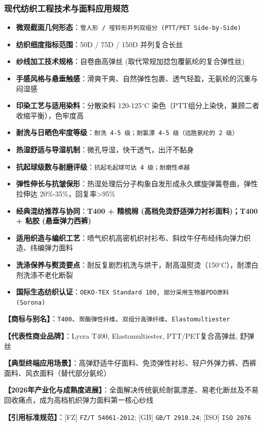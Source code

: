 \documentclass[11pt,openright,twoside,UTF8]{ctexbook}
\begin{document}
\subsubsection*{现代纺织工程技术与面料应用规范}
\begin{itemize} \setlength{\itemsep}{2pt}
    \item \textbf{微观截面几何形态}：\texttt{雪人形 / 哑铃形并列双组分 (PTT/PET Side-by-Side)}
    \item \textbf{纺织细度指标范围}：50D / 75D / 150D 并列复合长丝
    \item \textbf{纱线加工技术规格}：自卷曲高弹丝 (取代常规加捻包覆氨纶的复合弹性丝)
    \item \textbf{手感风格与悬垂触感}：滑爽干爽、自然弹性包裹、透气轻盈，无氨纶的沉重与闷湿感
    \item \textbf{印染工艺与适用染料}：分散染料 120-125$^\circ\mathrm{C}$ 染色（PTT组分上染快，兼顾二者收缩平衡），色牢度高
    \item \textbf{耐洗与日晒色牢度等级}：\texttt{耐洗 4-5 级；耐氯漂 4-5 级（远胜氨纶的 2 级）}
    \item \textbf{热湿舒适与导湿机制}：微孔导湿，快干透气，出汗不黏身
    \item \textbf{抗起球级数与耐磨评级}：\texttt{抗起毛起球可达 4 级；耐磨性卓越}
    \item \textbf{弹性伸长与抗皱保形}：热湿处理后分子构象自发形成永久螺旋弹簧卷曲，弹性拉伸达 20\%-35\%，回复率\textgreater{}95\%
    \item \textbf{经典混纺推荐与协同}：\textbf{T400 + 精梳棉 (高档免烫舒适弹力衬衫面料)；T400 + 粘胶 (悬垂弹力西裤)}
    \item \textbf{适用织造与编织工艺}：喷气织机高密机织衬衫布、斜纹牛仔布经纬向弹力织造、纬编弹力面料
    \item \textbf{洗涤保养与熨烫要点}：耐反复剧烈机洗与烘干，耐高温熨烫（150$^\circ\mathrm{C}$），耐漂白剂洗涤不老化断裂
    \item \textbf{国际生态纺织认证}：\texttt{OEKO-TEX Standard 100, 部分采用生物基PDO原料 (Sorona)}
\end{itemize}
\vspace{0.2cm}

\noindent\textbf{【商标与别名】}：\texttt{T400}、\texttt{聚酯弹性纤维}、\texttt{双组分高弹纤维}、\texttt{Elastomultiester}\par
\noindent\textbf{【代表性商业品牌】}：Lycra T400, Elastomultiester, PTT/PET复合高弹丝, 舒弹丝\par
\noindent\textbf{【典型终端应用场景】}：高弹舒适牛仔面料、免烫弹性衬衫、轻户外弹力裤、西裤面料、风衣面料（替代部分氨纶）\par
\noindent\textbf{【2026年产业化与成熟度进展】}：全面解决传统氨纶耐氯漂差、易老化断丝及不易回收痛点，成为高档机织弹力面料第一核心纱线\par
\noindent\textbf{【引用标准规范】}：[FZ] \texttt{FZ/T 54061-2012}; [GB] \texttt{GB/T 2910.24}; [ISO] \texttt{ISO 2076}\par
\vspace{0.5cm}
\end{document}
